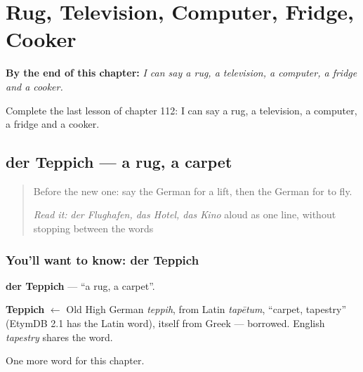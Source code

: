 
\chapter{Rug, Television, Computer, Fridge, Cooker}
\label{ch:ge-rug-television-computer-fridge-cooker}

\begin{chapteropening}
\textbf{By the end of this chapter:} \emph{I can say a rug, a television, a computer, a fridge and a cooker.}

Complete the last lesson of chapter 112: I can say a rug, a television, a computer, a fridge and a cooker.
\end{chapteropening}

\section[der Teppich]{der Teppich — a rug, a carpet}

\label{lesson:GE-C112-teppich}



\begin{quote}
Before the new one: say the German for a lift, then the German for to fly.

\emph{Read it:} \emph{der Flughafen, das Hotel, das Kino} aloud as one line, without stopping between the words
\end{quote}

\subsection*{You'll want to know: der Teppich}
\textbf{der Teppich} — \textquotedblleft{}a rug, a carpet\textquotedblright{}.

\begin{cousinweb}
\textbf{Teppich} $\leftarrow$ Old High German \emph{teppih}, from Latin \emph{tapētum}, \textquotedblleft{}carpet, tapestry\textquotedblright{} (EtymDB 2.1 has the Latin word), itself from Greek — borrowed. English \emph{tapestry} shares the word.
\end{cousinweb}

\begin{grammarlens}[title={What you've built}]
One more word for this chapter.
\end{grammarlens}


